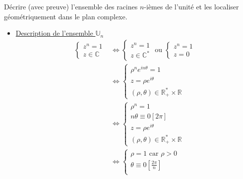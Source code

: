\documentclass{article}
\renewenvironment{question_kholle}[2][ ]
{
	\subsection{\texorpdfstring{#2}{}}
	\notblank{#1}
	{
		\noindent #1
		\bigbreak
	}
	{}
	\begin{proof}
}
{
	\end{proof}
}
\begin{document}
\begin{question_kholle}{Décrire (avec preuve) l'ensemble des racines $n$-ièmes de l'unité et les localiser géométriquement dans le plan complexe.}
    \begin{itemize}
        \item \underline{Description de l'ensemble $\mathbb U _n$}
        \begin{align*}
            \left\{ \begin{array}{ll}
                z^{n}=1 \\
                z \in \mathbb{C} 
            \end{array}\right.
            &\iff 
            \left\{ \begin{array}{ll}
                z^{n} = 1 \\
                z \in \mathbb{C}^{*}
            \end{array}\right. \text{ ou } 
            \left\{ \begin{array}{ll}
                z^{n} = 1 \\
                z = 0 
            \end{array}\right. \\
            & \iff 
            \left\{ \begin{array}{ll}
                \rho^{n}e^{in \theta}  = 1 \\
                z = \rho e^{i \theta} \\
                (\rho, \theta) \in \mathbb{R}_{+}^{*}\times \mathbb{R}
            \end{array}\right.
            \\ & \iff 
            \left\{ \begin{array}{ll} 
                \rho^{n} = 1 \\
                n \theta \equiv 0 [2 \pi]\\
                z = \rho e^{i \theta} \\
                (\rho, \theta) \in \mathbb{R}_{+}^{*}\times \mathbb{R}
            \end{array}\right. 
            \\ & \iff 
            \left\{ \begin{array}{ll} 
                \rho = 1 \text{ car } \rho > 0 \\
                \theta \equiv 0 \left[ \frac{2\pi}{n} \right]\\

\end{array}
\end{align*}
\end{itemize}
\end{question_kholle}
\end{document}
